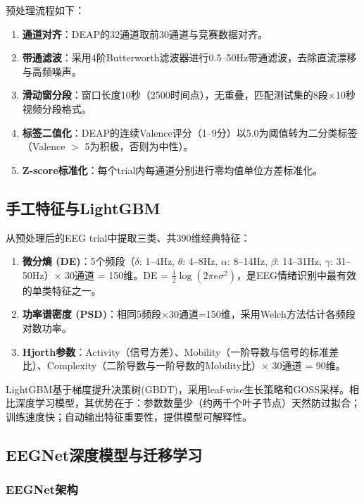 \documentclass[UTF8,zihao=-4,fontset=fandol]{ctexart}
\numberwithin{equation}{section}
\numberwithin{figure}{section}
\numberwithin{table}{section}
\begin{document}
预处理流程如下：

\begin{enumerate}
    \item \textbf{通道对齐}：DEAP的32通道取前30通道与竞赛数据对齐。
    \item \textbf{带通滤波}：采用4阶Butterworth滤波器进行0.5--50Hz带通滤波，去除直流漂移与高频噪声。
    \item \textbf{滑动窗分段}：窗口长度10秒（2500时间点），无重叠，匹配测试集的8段×10秒视频分段格式。
    \item \textbf{标签二值化}：DEAP的连续Valence评分（1--9分）以5.0为阈值转为二分类标签（Valence $>$ 5为积极，否则为中性）。
    \item \textbf{Z-score标准化}：每个trial内每通道分别进行零均值单位方差标准化。
\end{enumerate}

\subsection{手工特征与LightGBM}

从预处理后的EEG trial中提取三类、共390维经典特征：

\begin{enumerate}
    \item \textbf{微分熵 (DE)}：5个频段（$\delta$: 1--4Hz, $\theta$: 4--8Hz, $\alpha$: 8--14Hz, $\beta$: 14--31Hz, $\gamma$: 31--50Hz）× 30通道 = 150维。DE = $\frac{1}{2}\log(2\pi e\sigma^2)$，是EEG情绪识别中最有效的单类特征之一。
    \item \textbf{功率谱密度 (PSD)}：相同5频段×30通道=150维，采用Welch方法估计各频段对数功率。
    \item \textbf{Hjorth参数}：Activity（信号方差）、Mobility（一阶导数与信号的标准差比）、Complexity（二阶导数与一阶导数的Mobility比）× 30通道 = 90维。
\end{enumerate}

LightGBM基于梯度提升决策树(GBDT)，采用leaf-wise生长策略和GOSS采样。相比深度学习模型，其优势在于：参数数量少（约两千个叶子节点）天然防过拟合；训练速度快；自动输出特征重要性，提供模型可解释性。

\subsection{EEGNet深度模型与迁移学习}

\subsubsection{EEGNet架构}
\end{document}
